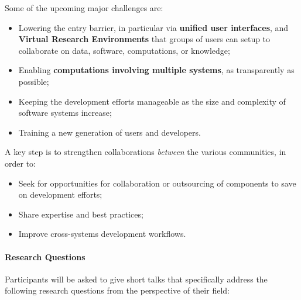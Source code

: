 Some of the upcoming major challenges are:
\begin{itemize}
\item Lowering the entry barrier, in particular via \textbf{unified user
    interfaces}, and \textbf{Virtual Research Environments} that
  groups of users can setup to collaborate on data, software,
  computations, or knowledge;
\item Enabling \textbf{computations involving multiple systems},
  as transparently as possible;
\item Keeping the development efforts manageable as the size and
  complexity of software systems increase;
\item Training a new generation of users and developers.
\end{itemize}

A key step is to strengthen collaborations \emph{between} the various
communities, in order to:
\begin{itemize}
\item Seek for opportunities for collaboration or outsourcing of
  components to save on development efforts;
\item Share expertise and best practices;
\item Improve cross-systems development workflows.
\end{itemize}

\paragraph{Research Questions}
Participants will be asked to give short talks that specifically address the following research questions from the perspective of their field:

